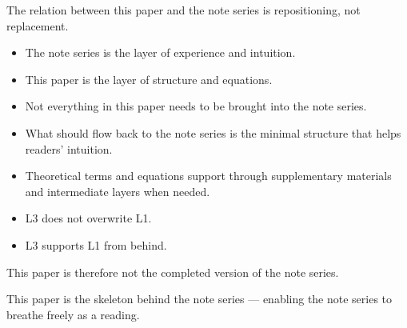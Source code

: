 The relation between this paper and the note series is repositioning, not replacement.

\begin{itemize}
\item The note series is the layer of experience and intuition.
\item This paper is the layer of structure and equations.
\item Not everything in this paper needs to be brought into the note series.
\item What should flow back to the note series is the minimal structure that helps readers' intuition.
\item Theoretical terms and equations support through supplementary materials and intermediate layers when needed.
\item L3 does not overwrite L1.
\item L3 supports L1 from behind.
\end{itemize}

This paper is therefore not the completed version of the note series.

This paper is the skeleton behind the note series — enabling the note series to breathe freely as a reading.
